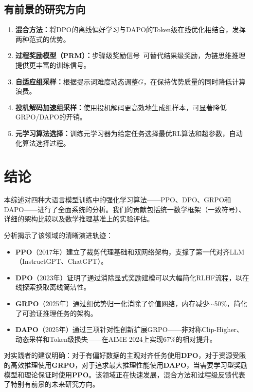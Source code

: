 \subsection{有前景的研究方向}

\begin{enumerate}[leftmargin=*, itemsep=2pt]
\item \textbf{混合方法：}将DPO的离线偏好学习与DAPO的Token级在线优化相结合，发挥两种范式的优势。
\item \textbf{过程奖励模型（PRM）：}步骤级奖励信号~\cite{lightman2024verify, uesato2022solving, wang2024mathshepherd}可替代结果级奖励，为链思维推理提供更丰富的训练信号。
\item \textbf{自适应组采样：}根据提示词难度动态调整$G$，在保持优势质量的同时降低计算浪费。
\item \textbf{投机解码加速组采样：}使用投机解码更高效地生成组样本，可显著降低GRPO/DAPO的开销。
\item \textbf{元学习算法选择：}训练元学习器为给定任务选择最优RL算法和超参数，自动化算法选择过程。
\end{enumerate}

\section{结论}
\label{sec:conclusion}

本综述对四种大语言模型训练中的强化学习算法——PPO、DPO、GRPO和DAPO——进行了全面系统的分析。我们的贡献包括统一数学框架（一致符号）、详细的架构比较以及数学推理基准上的实验评估。

分析揭示了该领域的清晰演进轨迹：
\begin{itemize}[leftmargin=*, itemsep=1pt]
\item \textbf{PPO}（2017年）建立了裁剪代理基础和双网络架构，支撑了第一代对齐LLM（InstructGPT、ChatGPT）。
\item \textbf{DPO}（2023年）证明了通过消除显式奖励建模可以大幅简化RLHF流程，以在线探索换取离线简洁性。
\item \textbf{GRPO}（2025年）通过组优势归一化消除了价值网络，内存减少$\sim$50\%，简化了可验证推理任务的架构。
\item \textbf{DAPO}（2025年）通过三项针对性创新扩展GRPO——非对称Clip-Higher、动态采样和Token级损失——在AIME 2024上实现67\%的相对提升。
\end{itemize}

对实践者的建议明确：对于有偏好数据的主观对齐任务使用\textbf{DPO}，对于资源受限的高效推理使用\textbf{GRPO}，对于追求最大推理性能使用\textbf{DAPO}，当需要学习型奖励模型和理论保证时使用\textbf{PPO}。该领域正在快速发展，混合方法和过程级反馈代表了特别有前景的未来研究方向。

